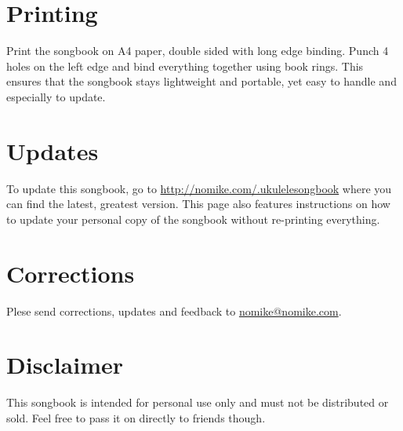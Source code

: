 \section*{Printing}
Print the songbook on A4 paper, double sided with long edge binding. Punch 4 holes on the left edge and bind everything together using book rings. This ensures that the songbook stays lightweight and portable, yet easy to handle and especially to update.

\section*{Updates}
To update this songbook, go to \url{http://nomike.com/.ukulelesongbook} where you can find the latest, greatest version.
This page also features instructions on how to update your personal copy of the songbook without re-printing everything.

\section*{Corrections}
Plese send corrections, updates and feedback to \url{nomike@nomike.com}.

\section*{Disclaimer}
This songbook is intended for personal use only and must not be distributed or sold. Feel free to pass it on directly to friends though.
